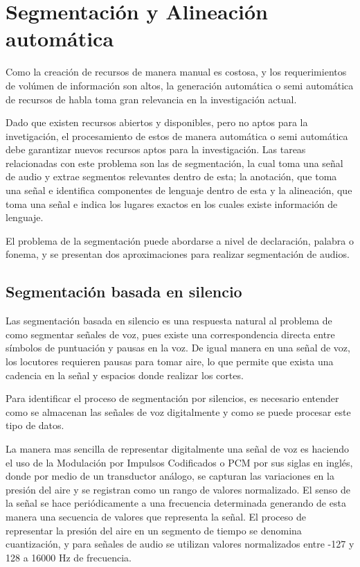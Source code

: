 \chapter{Segmentación y Alineación automática}

Como la creación de recursos de manera manual es costosa, y los requerimientos de volúmen de información son altos, la generación automática o semi automática de recursos de habla toma gran relevancia en la investigación actual.

Dado que existen recursos abiertos y disponibles, pero no aptos para la invetigación, el procesamiento de estos de manera automática o semi automática debe garantizar nuevos recursos aptos para la investigación. Las tareas relacionadas con este problema son las de segmentación, la cual toma una señal de audio y extrae segmentos relevantes dentro de esta; la anotación, que toma una señal e identifica componentes de lenguaje dentro de esta y la alineación, que toma una señal e indica los lugares exactos en los cuales existe información de lenguaje.

El problema de la segmentación puede abordarse a nivel de declaración, palabra o fonema, y se presentan dos aproximaciones para realizar segmentación de audios.

\section{Segmentación basada en silencio}

Las segmentación basada en silencio es una respuesta natural al problema de como segmentar señales de voz, pues existe una correspondencia directa entre símbolos de puntuación y pausas en la voz. De igual manera en una señal de voz, los locutores requieren pausas para tomar aire, lo que permite que exista una cadencia en la señal y espacios donde realizar los cortes.

Para identificar el proceso de segmentación por silencios, es necesario entender como se almacenan las señales de voz digitalmente y como se puede procesar este tipo de datos.

La manera mas sencilla de representar digitalmente una señal de voz es haciendo el uso de la Modulación por Impulsos Codificados o PCM por sus siglas en inglés, donde por medio de un transductor análogo, se capturan las variaciones en la presión del aire y se registran como un rango de valores normalizado. El senso de la señal se hace periódicamente a una frecuencia determinada generando de esta manera una secuencia de valores que representa la señal. El proceso de representar la presión del aire en un segmento de tiempo se denomina cuantización, y para señales de audio se utilizan valores normalizados entre -127 y 128 a 16000 Hz de frecuencia.

